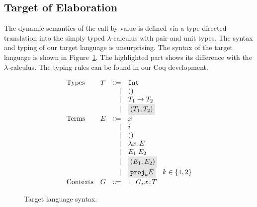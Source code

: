 
\subsection{Target of Elaboration}
The dynamic semantics of the call-by-value \name is defined via a
type-directed translation into the simply typed $\lambda$-calculus
with pair and unit types. 
The syntax and typing of our target language is unsurprising. The syntax of the
target language is shown in Figure~\ref{fig:f-syntax}. The highlighted part
shows its difference with the $\lambda$-calculus. 
The typing rules can be found in our Coq development.

\begin{figure}[t]
  \[
    \begin{array}{llrl}
      \text{Types}    & T & \Coloneqq & \code{Int} \\
                      &   & \mid      & \unit \\
                      &   & \mid      & {T_1} \to {T_2} \\
                      &   & \mid      & \highlight {$ \pair {T_1} {T_2} $} \\
      \text{Terms}    & E & \Coloneqq & x \\
                      &   & \mid      & i \\
                      &   & \mid      & \unit \\
                      &   & \mid      & \lamty x T E \\
                      &   & \mid      & \app {E_1} {E_2} \\
                      &   & \mid      & \highlight {$ \pair {E_1} {E_2} $} \\
                      &   & \mid      & \highlight {$ \proj k E $} \quad k \in \{ 1, 2 \} \\
      \text{Contexts} & G & \Coloneqq & \cdot \mid G, x \oftype T \\
    \end{array}
  \]
  \caption{Target language syntax.}
  \label{fig:f-syntax}
\end{figure}

